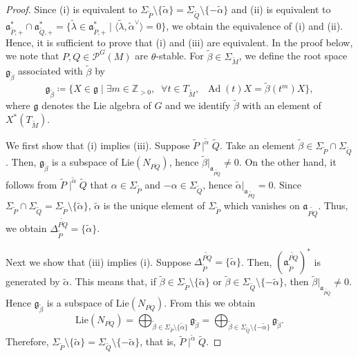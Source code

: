 \documentclass[12pt]{amsart}
\theoremstyle{definition}
\theoremstyle{plain}
\theoremstyle{remark}
\def\Z{\mathbb{Z}}%
\DeclareMathOperator{\Ad}{Ad}%
\newcommand{\fa}{\mathfrak{a}}
\newcommand{\fg}{\mathfrak{g}}
\newcommand{\cP}{\mathcal{P}}
\numberwithin{equation}{section}
\newcommand{\tM}{\widetilde{M}}
\newcommand{\tP}{\widetilde{P}}
\newcommand{\tQ}{\widetilde{Q}}
\newcommand{\talpha}{\widetilde{\alpha}}
\newcommand{\tbeta}{\widetilde{\beta}}
\newcommand{\tlambda}{\widetilde{\lambda}}
\begin{document}
\begin{proof}
Since (i) is equivalent to $\Sigma_{\tP}\setminus\{\talpha\}=\Sigma_{\tQ}\setminus\{-\talpha\}$ 
and (ii) is equivalent to $\fa^*_{\tP,+}\cap \fa^*_{\tQ,+}=\{\tlambda\in \fa^*_{\tP,+} \mid \langle \tlambda, \talpha^\vee \rangle=0\}$, we obtain the equivalence of \textup{(i)} and \textup{(ii)}.
Hence, it is sufficient to prove that \textup{(i)} and \textup{(iii)} are equivalent. 
In the proof below, we note that $P, Q \in \cP^G(M)$ are $\theta$-stable.
For $\tbeta\in\Sigma_{\tM}$, we define the root space $\fg_{\tbeta}$ associated with $\tbeta$ by
\[
\fg_{\tbeta}\coloneqq\{X\in\fg\mid \exists m\in\Z_{>0},\;\; \forall t\in T_{\tM}, \;\; \Ad(t)X=\tbeta(t^m)X \},
\]
where $\fg$ denotes the Lie algebra of $G$ and we identify $\tbeta$ with an element of $X^*(T_{\tM})$.


We first show that (i) implies (iii).
Suppose $\tP\mid^{\talpha}\tQ$. 
Take an element $\tbeta\in \Sigma_{\tP}\cap\Sigma_{\tQ}$. 
Then, $\fg_{\tbeta}$ is a subspace of $\mathrm{Lie}(N_{\overline{PQ}})$, 
hence $\tbeta|_{\fa_{\widetilde{\overline{PQ}}}}\neq 0$.
On the other hand, it follows from $\tP\mid^{\talpha}\tQ$ that $\alpha\in\Sigma_{\tP}$ and $-\alpha\in\Sigma_{\tQ}$, hence $\talpha|_{\fa_{\widetilde{\overline{PQ}}}}=0$.
Since $\Sigma_{\tP}\cap\Sigma_{\tQ}=\Sigma_{\tP}\setminus\{\talpha\}$, $\talpha$ is the unique element of $\Sigma_{\tP}$ which vanishes on $\fa_{\widetilde{\overline{PQ}}}$. Thus, we obtain
$\Delta_{\tP}^{\widetilde{\overline{PQ}}}=\{\talpha\}$.

Next we show that (iii) implies (i).
Suppose $\Delta_{\tP}^{\widetilde{\overline{PQ}}}=\{\talpha\}$.
Then, $(\fa_{\tP}^{\widetilde{\overline{PQ}}})^*$ is generated by $\talpha$. 
This means that, if $\tbeta\in \Sigma_{\tP}\setminus\{\talpha\}$ or $\tbeta\in \Sigma_{\tQ}\setminus\{-\talpha\}$, then $\tbeta|_{\fa_{\widetilde{\overline{PQ}}}}\neq 0$. Hence $\fg_{\tbeta}$ is a subspace of $\mathrm{Lie}(N_{\overline{PQ}})$.
From this we obtain
\[
\mathrm{Lie}(N_{\overline{PQ}})=\bigoplus_{\tbeta\in\Sigma_{\tP}\setminus\{\talpha\}} \fg_{\tbeta}=\bigoplus_{\tbeta\in\Sigma_{\tQ}\setminus\{-\talpha\}} \fg_{\tbeta}.
\]
Therefore, $\Sigma_{\tP}\setminus\{\talpha\}=\Sigma_{\tQ}\setminus\{-\talpha\}$, that is, $\tP\mid^{\talpha}\tQ$.
\end{proof}
\end{document}
